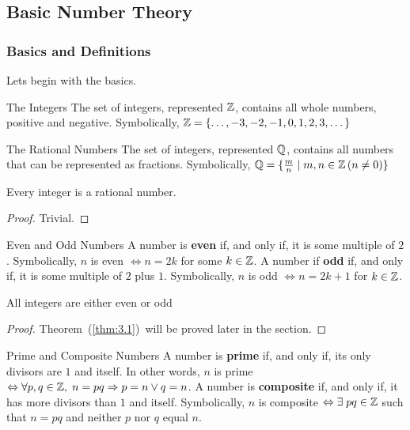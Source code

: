 \subsection{Basic Number Theory}
\subsubsection{Basics and Definitions}
Lets begin with the basics.

\begin{definition}{The Integers}{}
    The set of integers, represented $\mathbb Z$, contains all whole numbers, positive and negative. Symbolically, $\mathbb Z = \{\dots, -3, -2, -1, 0, 1, 2, 3, \dots\}$
\end{definition}

\begin{definition}{The Rational Numbers}{}
    The set of integers, represented $\mathbb Q$, contains all numbers that can be represented as fractions. Symbolically, $\mathbb Q = \{\frac{m}{n} \mid m, n \in \mathbb Z\left(n \neq 0\right)\}$
\end{definition}

\begin{tcolorbox}[colback=pink!70]
\begin{theorem}
    Every integer is a rational number.
\end{theorem}
\begin{proof}
    Trivial.
\end{proof}
\end{tcolorbox}

\begin{definition}{Even and Odd Numbers}{}
    A number is \textbf{even} if, and only if, it is some multiple of $2$. Symbolically, $n$ is even $\Leftrightarrow n=2k$ for some $k \in \mathbb Z$. A number if \textbf{odd} if, and only if, it is some multiple of $2$ plus $1$. Symbolically, $n$ is odd $\Leftrightarrow n=2k+1$ for $k\in\mathbb Z$.
\end{definition}

\begin{tcolorbox}[colback=pink!70]
\begin{theorem}{\label{thm:3.1}}
    All integers are either even or odd
\end{theorem}
\begin{proof}
    Theorem~(\ref{thm:3.1})~will be proved later in the section.
\end{proof}
\end{tcolorbox}

\begin{definition}{Prime and Composite Numbers}{}
    A number is \textbf{prime} if, and only if, its only divisors are $1$ and itself. In other words, $n$ is prime $\Leftrightarrow \forall p, q \in \mathbb Z, \hspace{0.1cm} n=pq \Rightarrow p=n \lor q=n$. A number is \textbf{composite} if, and only if, it has more divisors than $1$ and itself. Symbolically, $n$ is composite $\Leftrightarrow \exists \hspace{0.1cm} pq \in \mathbb Z$ such that $n=pq$ and neither $p$ nor $q$ equal $n$. 
\end{definition}

